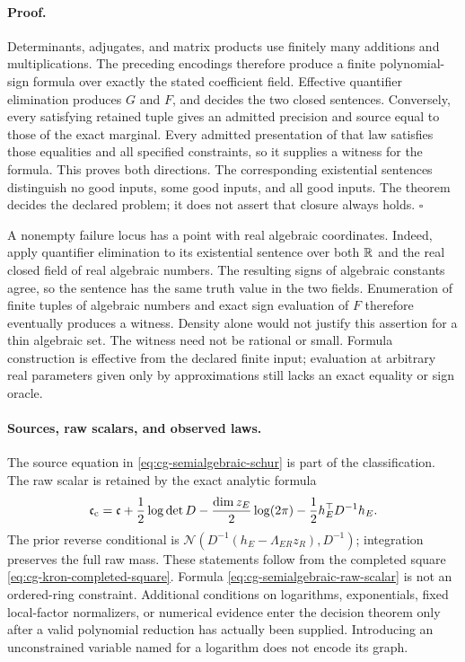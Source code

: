 \paragraph{Proof.}
Determinants, adjugates, and matrix products use finitely many
additions and multiplications. The preceding encodings therefore
produce a finite polynomial-sign formula over exactly the stated
coefficient field. Effective quantifier elimination produces \(G\)
and \(F\), and decides the two closed sentences. Conversely, every
satisfying retained tuple gives an admitted precision and source
equal to those of the exact marginal. Every admitted presentation
of that law satisfies those equalities and all specified constraints,
so it supplies a witness for the formula. This proves both directions.
The corresponding existential sentences distinguish no good inputs,
some good inputs, and all good inputs. The theorem decides the
declared problem; it does not assert that closure always holds.
\(\square\)

A nonempty failure locus has a point with real algebraic coordinates.
Indeed, apply quantifier elimination to its existential sentence
over both \(\mathbb R\) and the real closed field of real algebraic numbers.
The resulting signs of algebraic constants agree, so the sentence
has the same truth value in the two fields. Enumeration of finite
tuples of algebraic numbers and exact sign evaluation of \(F\)
therefore eventually produces a witness. Density alone would not
justify this assertion for a thin algebraic set. The witness need
not be rational or small. Formula construction is effective from
the declared finite input; evaluation at arbitrary real parameters
given only by approximations still lacks an exact equality or
sign oracle.

\paragraph{Sources, raw scalars, and observed laws.}
The source equation in \eqref{eq:cg-semialgebraic-schur} is part of
the classification. The raw scalar is retained by the exact analytic
formula
\begin{equation}
\mathfrak c_{\rm c}
=\mathfrak c+\frac12\log\det D
-\frac{\dim z_E}{2}\log(2\pi)
-\frac12h_E^\top D^{-1}h_E.
\label{eq:cg-semialgebraic-raw-scalar}
\end{equation}
The prior reverse conditional is
\(\mathcal N(D^{-1}(h_E-\Lambda_{ER}z_R),D^{-1})\);
integration preserves the full raw mass. These statements follow
from the completed square
\eqref{eq:cg-kron-completed-square}. Formula
\eqref{eq:cg-semialgebraic-raw-scalar} is not an ordered-ring
constraint. Additional conditions on logarithms, exponentials,
fixed local-factor normalizers, or numerical evidence enter the
decision theorem only after a valid polynomial reduction has
actually been supplied. Introducing an unconstrained variable
named for a logarithm does not encode its graph.

